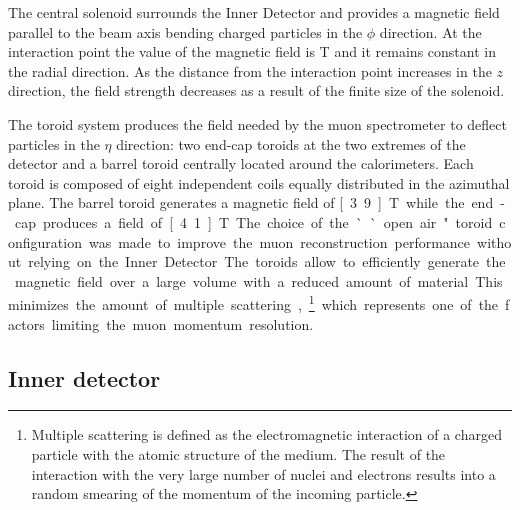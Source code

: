 The central solenoid surrounds the Inner Detector and provides a magnetic field parallel to the beam axis bending charged particles in the $\phi$ direction.
 At the interaction point the value of the magnetic field is \unit[2]{T} and it remains constant in the radial direction.
As the distance from the interaction point  increases in the $z$ direction, the field strength decreases as a result of the finite size of the solenoid.

The toroid system produces the field needed by the muon spectrometer to deflect particles in the $\eta$ direction: 
two end-cap toroids at the two extremes of the detector and a 
barrel toroid centrally located around the calorimeters.
Each toroid is composed of eight independent coils equally distributed in the azimuthal plane.
The barrel toroid generates a magnetic field of \unit[3.9]{T} while the end-cap produces a field of \unit[4.1]{T}.
The choice of the ``open air" toroid configuration was made to improve the muon reconstruction performance without relying on the Inner Detector.
The toroids allow to efficiently generate the magnetic field over a large volume with a reduced amount of material.
This minimizes the amount of multiple scattering,\footnote{
Multiple scattering is defined as the electromagnetic interaction of a charged particle with the atomic structure of the medium.
The result of the interaction with the very large number of nuclei and electrons results into a random smearing of the momentum of the incoming particle.} 
which represents one of the factors limiting the muon momentum resolution.


\subsection{Inner detector}
\label{subsec:InnerDetector}


